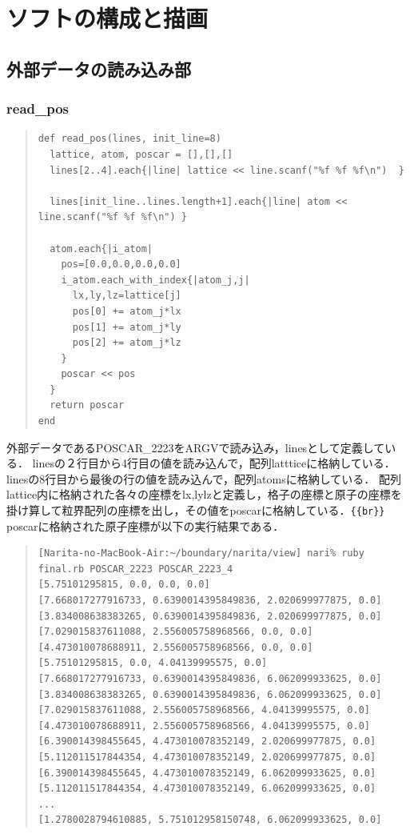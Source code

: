 
\section{ソフトの構成と描画}
\subsection{外部データの読み込み部}
\subsubsection{read\_pos}\begin{quote}\begin{verbatim}
def read_pos(lines, init_line=8)
  lattice, atom, poscar = [],[],[]
  lines[2..4].each{|line| lattice << line.scanf("%f %f %f\n")  }

  lines[init_line..lines.length+1].each{|line| atom << line.scanf("%f %f %f\n") }

  atom.each{|i_atom|
    pos=[0.0,0.0,0.0,0.0]
    i_atom.each_with_index{|atom_j,j|
      lx,ly,lz=lattice[j]
      pos[0] += atom_j*lx
      pos[1] += atom_j*ly
      pos[2] += atom_j*lz
    }
    poscar << pos
  }
  return poscar
end
\end{verbatim}\end{quote}
外部データであるPOSCAR\_2223をARGVで読み込み，linesとして定義している．
linesの２行目から4行目の値を読み込んで，配列lattticeに格納している．
linesの8行目から最後の行の値を読み込んで，配列atomsに格納している．
配列lattice内に格納された各々の座標をlx,lylzと定義し，格子の座標と原子の座標を掛け算して粒界配列の座標を出し，その値をposcarに格納している．\verb|{{br}}|
poscarに格納された原子座標が以下の実行結果である．
\begin{quote}\begin{verbatim}
[Narita-no-MacBook-Air:~/boundary/narita/view] nari% ruby final.rb POSCAR_2223 POSCAR_2223_4
[5.75101295815, 0.0, 0.0, 0.0]
[7.668017277916733, 0.6390014395849836, 2.020699977875, 0.0]
[3.834008638383265, 0.6390014395849836, 2.020699977875, 0.0]
[7.029015837611088, 2.556005758968566, 0.0, 0.0]
[4.473010078688911, 2.556005758968566, 0.0, 0.0]
[5.75101295815, 0.0, 4.04139995575, 0.0]
[7.668017277916733, 0.6390014395849836, 6.062099933625, 0.0]
[3.834008638383265, 0.6390014395849836, 6.062099933625, 0.0]
[7.029015837611088, 2.556005758968566, 4.04139995575, 0.0]
[4.473010078688911, 2.556005758968566, 4.04139995575, 0.0]
[6.390014398455645, 4.473010078352149, 2.020699977875, 0.0]
[5.112011517844354, 4.473010078352149, 2.020699977875, 0.0]
[6.390014398455645, 4.473010078352149, 6.062099933625, 0.0]
[5.112011517844354, 4.473010078352149, 6.062099933625, 0.0]
...
[1.2780028794610885, 5.751012958150748, 6.062099933625, 0.0]
\end{verbatim}\end{quote}
